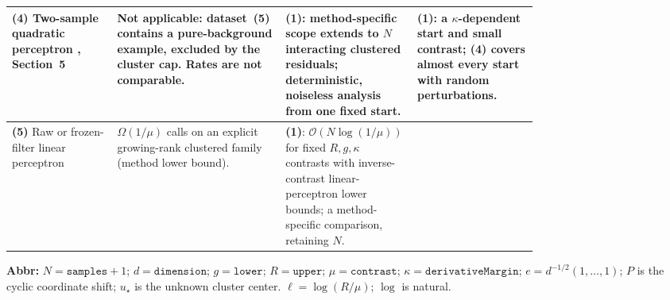 \begin{table}[tp]
\begin{threeparttable}
\begin{tabularx}{\linewidth}{@{}>{\raggedright\arraybackslash}p{0.20\linewidth}>{\raggedright\arraybackslash}p{0.32\linewidth}>{\raggedright\arraybackslash}p{0.25\linewidth}>{\raggedright\arraybackslash}X@{}}
\midrule
\textbf{(4)} Two-sample quadratic perceptron \citep{tqpTyurin2026v2}, Section~5 & Not applicable: dataset~(5) contains a pure-background example, excluded by the cluster cap. Rates are not comparable. & \textbf{(1)}: method-specific scope extends to $N$ interacting clustered residuals; deterministic, noiseless analysis from one fixed start. & \textbf{(1)}: a $\kappa$-dependent start and small contrast; \textbf{(4)} covers almost every start with random perturbations. \\
\midrule
\textbf{(5)} Raw or frozen-filter linear perceptron \citep{ccpLowerSource} & $\Omega(1/\mu)$ calls on an explicit growing-rank clustered family (method lower bound). & \textbf{(1)}: $\mathcal O(N\log(1/\mu))$ for fixed $R,g,\kappa$ contrasts with inverse-contrast linear-perceptron lower bounds; a method-specific comparison, retaining $N$. & \\
\bottomrule
\end{tabularx}
\begin{tablenotes}[flushleft]\footnotesize
\item[] \textbf{Abbr:} $N=\texttt{samples}+1$; $d=\texttt{dimension}$; $g=\texttt{lower}$; $R=\texttt{upper}$; $\mu=\texttt{contrast}$; $\kappa=\texttt{derivativeMargin}$; $e=d^{-1/2}(1,\ldots,1)$; $P$ is the cyclic coordinate shift; $u_\star$ is the unknown cluster center. $\ell=\log(R/\mu)$; $\log$ is natural.
\end{tablenotes}
\end{threeparttable}
\end{table}
